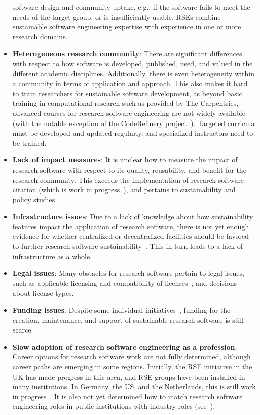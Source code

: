 \documentclass[a4paper,num-refs,numbers,sort&compress]{de-rse}
\begin{document}
\begin{itemize}
  software design and community uptake, e.g., if the software fails to meet the needs of the
  target group, or is insufficiently usable. RSEs
  combine sustainable software engineering expertise with experience in one or
  more research domains.
\item
  \textbf{Heterogeneous research community}:
  There are significant differences with respect to how software is developed, published, used, and valued in the different academic disciplines. Additionally, there is even heterogeneity within a community in terms of application and approach.
  This also makes it hard to train researchers for sustainable software development,
  as beyond basic training in computational research such as provided by The Carpentries, advanced courses for research software engineering are not widely available (with the notable exception of the CodeRefinery project~\cite{CodeRefinery}).
  Targeted curricula must be developed and updated regularly, and specialized instructors need to be trained.
\item
  \textbf{Lack of impact measures}: It is unclear how to measure the impact
  of research software with respect to its quality, reusability, and benefit for the research community. This exceeds the
  implementation of research software citation (which is work in progress~\cite{smithSoftwareCitationPrinciples2016,liSoftwareCitationReuse2016,katzSoftwareCitationImplementation2019,druskatSoftwareDependenciesResearch2019}), and pertains to sustainability and policy studies.
\item
  \textbf{Infrastructure issues}: Due to a lack of knowledge about
  how sustainability features impact the application of research software, there is not yet enough evidence
  for whether centralized or decentralized facilities should be favored to
  further research software sustainability~\cite{Kuchinke2016,SuLMaSS,Hexatomic}.
  This in turn leads to a lack of infrastructure as a whole.
\item
  \textbf{Legal issues}: Many obstacles for research software pertain to
  legal issues, such as applicable licensing and compatibility of licenses~\cite{morinQuickGuideSoftware2012}, and decisions about license types.
\item
  \textbf{Funding issues}: Despite some individual initiatives~\cite{katzLookingSoftwareSustainability2015,DFGcall1,DFGcall2,ChanZuckerberg}, funding for the creation, maintenance, and
  support of sustainable research software is still scarce.
\item
  \textbf{Slow adoption of research software engineering as a profession}: Career options for
  research software work are not fully determined, although career paths are emerging in some regions.
  Initially, the RSE initiative in the UK has made progress in this area, and RSE groups have been installed in many institutions. In Germany, the
  US, and the Netherlands, this is still work in progress~\cite{SSIRSE,de-rse,us-rse,nl-rse}. It is also not yet
  determined how to match research software engineering roles in public
  institutions with industry roles (see~\cite{rodriguez-sanchezAcademiaFailureRetain2017}).
\end{itemize}
\end{document}
